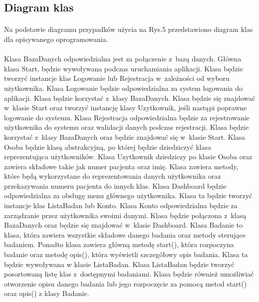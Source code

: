 \documentclass[12pt, letterpaper]{article}
\begin{document}
		
\newpage
\subsection{Diagram klas}	
\paragraph{}		
Na podstawie diagramu przypadków użycia na Rys.5 przedstawiono diagram klas dla opisywanego oprogramowania.\\	
		
\paragraph{}
Klasa {\selectfont BazaDanych} odpowiedzialna jest za połączenie z~bazą danych. Główna klasa {\selectfont Start}, będzie wywoływana podczas uruchamiania aplikacji. Klasa będzie tworzyć instancje klas Logowanie lub Rejestracja w~zależności od wyboru użytkownika. Klasa {\selectfont Logowanie} będzie odpowiedzialna za system logowania do aplikacji. Klasa będzie korzystać z~klasy BazaDanych. Klasa będzie się znajdować w~klasie Start oraz tworzyć instancję klasy Uzytkownik, jeśli nastąpi poprawne logowanie do systemu. Klasa {\selectfont Rejestracja} odpowiedzialna będzie za rejestrowanie użytkownika do systemu oraz walidacji danych podczas rejestracji. Klasa będzie korzystać z~klasy BazaDanych oraz będzie znajdować się w~klasie Start. Klasa {\selectfont Osoba} będzie klasą abstrakcyjną, po której będzie dziedziczyć klasa reprezentująca użytkowników. Klasa {\selectfont Uzytkownik} dziedziczy po klasie Osoba oraz zawiera składowe takie jak numer pacjenta oraz imię. Klasa zawiera metody, które będą wykorzystane do reprezentowania danych użytkownika oraz przekazywania numeru pacjenta do innych klas. Klasa {\selectfont Dashboard} będzie odpowiedzialna za obsługę menu głównego użytkownika. Klasa ta będzie tworzyć instancje klas ListaBadan lub Konto. Klasa {\selectfont Konto} odpowiedzialna będzie za zarządzanie przez użytkownika swoimi danymi. Klasa będzie połączona z~klasą BazaDanych oraz będzie się znajdować w~klasie Dashboard. Klasa {\selectfont Badanie} to klasa, która zawiera wszystkie składowe danego badania oraz metody sterujące badaniem. Ponadto klasa zawiera główną metodę start(), która rozpoczyna badanie oraz metodę opis(), która wyświetli szczegółowy opis badania. Klasa ta będzie wywoływana w klasie ListaBadan. Klasa {\selectfont ListaBadan} będzie tworzyć posortowaną listę klas z~dostępnymi badaniami. Klasa będzie również umożliwiać otworzenie opisu danego badania lub jego rozpoczęcie za pomocą metod start() oraz opis() z klasy Badanie.\\
		
\end{document}
